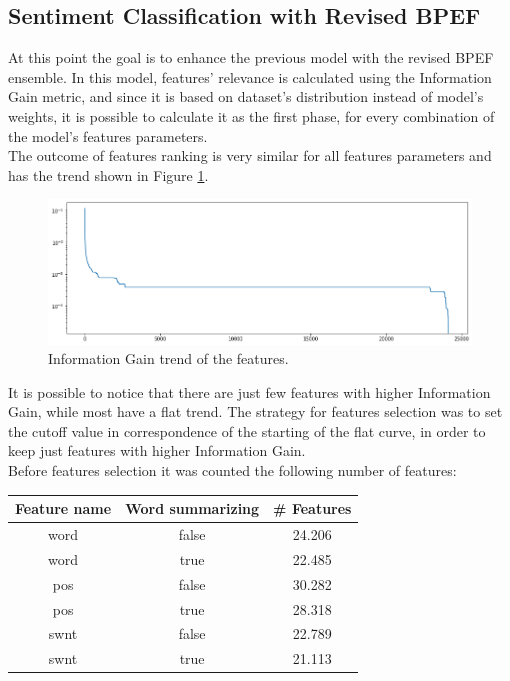 \subsection{Sentiment Classification with Revised BPEF}

At this point the goal is to enhance the previous model with the revised BPEF ensemble. In this model, features' relevance is calculated using the Information Gain metric, and since it is based on dataset's distribution instead of model's weights, it is possible to calculate it as the first phase, for every combination of the model's features parameters.\\
The outcome of features ranking is very similar for all features parameters and has the trend shown in Figure \ref{fig:twitter_bpef_fs_1}.

\begin{figure}[H]
	\centering
	\includegraphics[width=\textwidth]{figures/conf_matrices/twitter_snt_bpef/bpef_fs_1.png}
	\caption{Information Gain trend of the features.}
	\label{fig:twitter_bpef_fs_1}
\end{figure}

It is possible to notice that there are just few features with higher Information Gain, while most have a flat trend. The strategy for features selection was to set the cutoff value in correspondence of the starting of the flat curve, in order to keep just features with higher Information Gain.\\
Before features selection it was counted the following number of features:

\begin{center}
	\begin{tabular}{ c  c  c } 
		\hline
		\textbf{Feature name} & \textbf{Word summarizing} & \textbf{\# Features} \\
		\hline
		word & false & 24.206 \\ 
		\hline
		word & true & 22.485 \\ 
		\hline
		pos & false & 30.282 \\ 
		\hline
		pos & true & 28.318 \\ 
		\hline
		swnt & false & 22.789 \\ 
		\hline
		swnt & true & 21.113 \\ 
		\hline
	\end{tabular}
\end{center}

